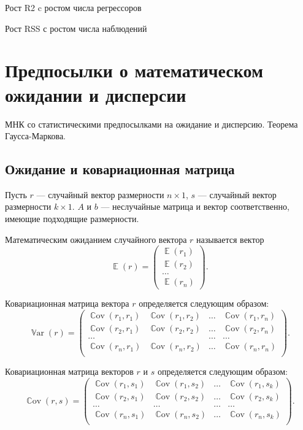 \documentclass[12pt]{article}
\DeclareMathOperator{\Cov}{\mathbb{C}ov}
\DeclareMathOperator{\Var}{\mathbb{V}ar}
\DeclareMathOperator{\E}{\mathbb{E}}
\begin{document}
Рост R2 c ростом числа регрессоров

Рост RSS с ростом числа наблюдений

\section{Предпосылки о математическом ожидании и дисперсии}
МНК со статистическими предпосылками на ожидание и дисперсию. Теорема Гаусса-Маркова.




\subsection{Ожидание и ковариационная матрица }

Пусть $r$ --- случайный вектор размерности $n \times 1$, $s$ --- случайный вектор размерности $k \times 1$. $A$ и $b$ --- неслучайные матрица и вектор соответственно, имеющие подходящие размерности.

Математическим ожиданием случайного вектора $r$ называется вектор
\[
\E(r) = \begin{pmatrix}
	\E(r_1)  \\
	\E(r_2)  \\
        \dots \\
        \E(r_n)
      \end{pmatrix}.
\]

Ковариационная матрица вектора $r$ определяется следующим образом:
\[
\Var(r) = \begin{pmatrix}
	\Cov(r_1,r_1) & \Cov(r_1,r_2) & \dots & \Cov(r_1,r_n) \\
	\Cov(r_2,r_1) & \Cov(r_2,r_2) & \dots & \Cov(r_2,r_n) \\
        \dots & & \dots & \dots\\
        \Cov(r_n,r_1) & \Cov(r_n,r_2) & \dots & \Cov(r_n,r_n) \\
      \end{pmatrix}.
\]

Ковариационная матрица векторов $r$ и $s$ определяется следующим образом:
\[
\Cov(r,s) = \begin{pmatrix}
	\Cov(r_1,s_1) & \Cov(r_1,s_2) & \dots & \Cov(r_1,s_k) \\
	\Cov(r_2,s_1) & \Cov(r_2,s_2) & \dots & \Cov(r_2,s_k) \\
        \dots & \dots & \dots & \dots\\
        \Cov(r_n,s_1) & \Cov(r_n,s_2) & \dots & \Cov(r_n,s_k) \\
      \end{pmatrix}.
\]
\end{document}
